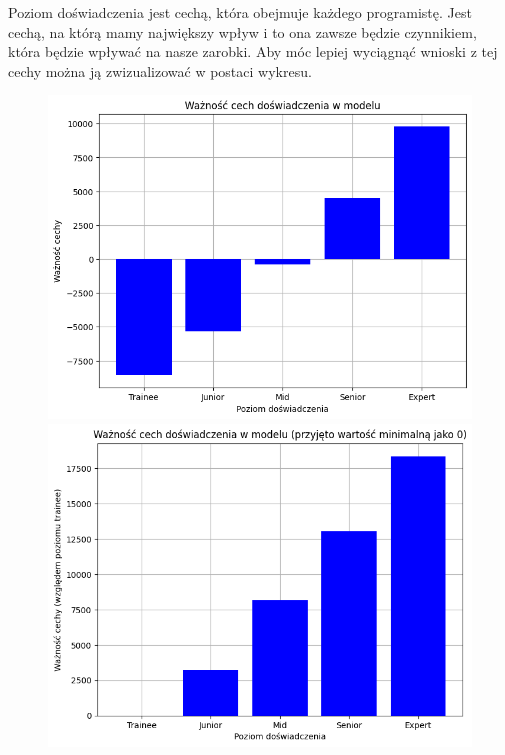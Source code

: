 \documentclass{article}
\begin{document}
Poziom doświadczenia jest cechą, która obejmuje każdego programistę.
Jest cechą, na którą mamy największy wpływ i to ona zawsze będzie czynnikiem,
która będzie wpływać na nasze zarobki. Aby móc lepiej wyciągnąć wnioski z tej cechy można ją
zwizualizować w postaci wykresu.

\begin{figure}[h]
    \centering
    \begin{minipage}{0.45\textwidth}
        \centering
        \includegraphics[width=\textwidth]{img/exp_importance.png}
    \end{minipage}
    \hfill
    \begin{minipage}{0.45\textwidth}
        \centering
        \includegraphics[width=\textwidth]{img/exp_importance_abs.png}
    \end{minipage}
\end{figure}
\end{document}
